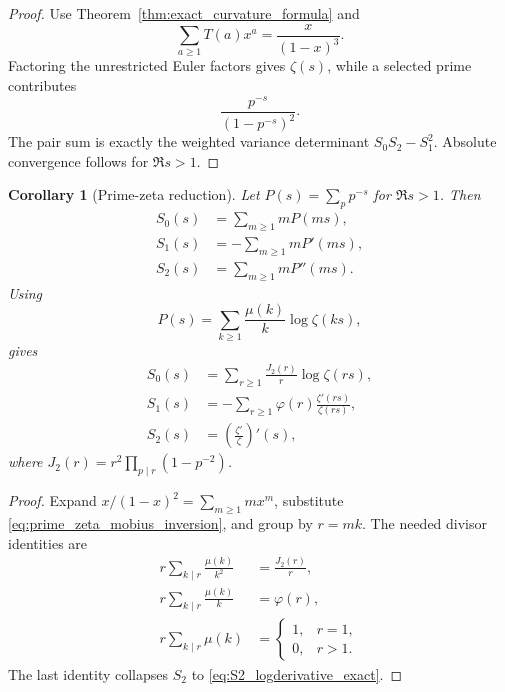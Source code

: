\documentclass[11pt]{amsart}
\numberwithin{equation}{section}
\theoremstyle{plain}
\newtheorem{corollary}[theorem]{Corollary}
\theoremstyle{definition}
\theoremstyle{remark}
\begin{document}
\begin{proof}
Use Theorem~\ref{thm:exact_curvature_formula} and
\begin{equation}
\sum_{a\ge1}T(a)x^a=\frac{x}{(1-x)^3}.
\label{eq:triangular_generating_function}
\end{equation}
Factoring the unrestricted Euler factors gives \(\zeta(s)\), while a selected
prime contributes
\begin{equation}
\frac{p^{-s}}{(1-p^{-s})^2}.
\label{eq:selected_prime_weight}
\end{equation}
The pair sum is exactly the weighted variance determinant
\(S_0S_2-S_1^2\). Absolute convergence follows for \(\Re s>1\).
\end{proof}

\begin{corollary}[Prime-zeta reduction]
\label{cor:prime_zeta_representation}
Let \(P(s)=\sum_p p^{-s}\) for \(\Re s>1\). Then
\begin{align}
S_0(s)&=\sum_{m\ge1}mP(ms),
\label{eq:S0_prime_zeta}\\
S_1(s)&=-\sum_{m\ge1}mP'(ms),
\label{eq:S1_prime_zeta}\\
S_2(s)&=\sum_{m\ge1}mP''(ms).
\label{eq:S2_prime_zeta}
\end{align}
Using
\begin{equation}
P(s)=\sum_{k\ge1}\frac{\mu(k)}{k}\log\zeta(ks),
\label{eq:prime_zeta_mobius_inversion}
\end{equation}
gives
\begin{align}
S_0(s)&=\sum_{r\ge1}\frac{J_2(r)}{r}\log\zeta(rs),
\label{eq:S0_logzeta}\\
S_1(s)&=-\sum_{r\ge1}\varphi(r)\frac{\zeta'(rs)}{\zeta(rs)},
\label{eq:S1_logderivative}\\
S_2(s)&=\left(\frac{\zeta'}{\zeta}\right)'(s),
\label{eq:S2_logderivative_exact}
\end{align}
where \(J_2(r)=r^2\prod_{p\mid r}(1-p^{-2})\).
\end{corollary}

\begin{proof}
Expand \(x/(1-x)^2=\sum_{m\ge1}mx^m\), substitute
\eqref{eq:prime_zeta_mobius_inversion}, and group by \(r=mk\). The needed
divisor identities are
\begin{align}
r\sum_{k\mid r}\frac{\mu(k)}{k^2}&=\frac{J_2(r)}r,
\label{eq:J2_divisor_identity}\\
r\sum_{k\mid r}\frac{\mu(k)}k&=\varphi(r),
\label{eq:phi_divisor_identity}\\
r\sum_{k\mid r}\mu(k)&=\begin{cases}1,&r=1,\\0,&r>1.\end{cases}
\label{eq:mobius_divisor_delta}
\end{align}
The last identity collapses \(S_2\) to
\eqref{eq:S2_logderivative_exact}.
\end{proof}
\end{document}
